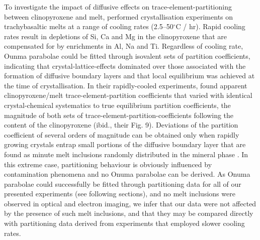 \documentclass[review,authoryear,12pt]{elsarticle}
\newcommand{\dgC}{$^\circ$C }
\begin{document}

To investigate the impact of diffusive effects on trace-element-partitioning between clinopyroxene and melt, \citet{Mollo2013} performed crystallisation experiments on trachybasaltic melts at a range of cooling rates (2.5--50\dgC/ hr). Rapid cooling rates result in depletions of Si, Ca and Mg in the clinopyroxene that are compensated for by enrichments in Al, Na and Ti. Regardless of cooling rate, Ounma parabolae could be fitted through isovalent sets of partition coefficients, indicating that crystal-lattice-effects dominated over those associated with the formation of diffusive boundary layers and that local equilibrium was achieved at the time of crystallisation.
    In their rapidly-cooled experiments, \citet{Mollo2013} found apparent clinopyroxene/melt trace-element-partition coefficients that varied with identical crystal-chemical systematics to true equilibrium partition coefficients, the magnitude of both sets of trace-element-partition-coefficients following the  content of the clinopyroxene (ibid., their Fig. 9). 
Deviations of the partition coefficient of several orders of magnitude can be obtained only when rapidly growing crystals entrap small portions of the diffusive boundary layer that are found as minute melt inclusions randomly distributed in the mineral phase \citep{Kennedy1993}. In this extreme case, partitioning behaviour is obviously influenced by contamination phenomena and no Onuma parabolae can be derived. As Onuma parabolae could successfully be fitted through partitioning data for all of our presented experiments (see following sections), and no melt inclusions were observed in optical and electron imaging, we infer that our data were not affected by the presence of such melt inclusions, and that they may be compared directly with partitioning data derived from experiments that employed slower cooling rates.
\end{document}

